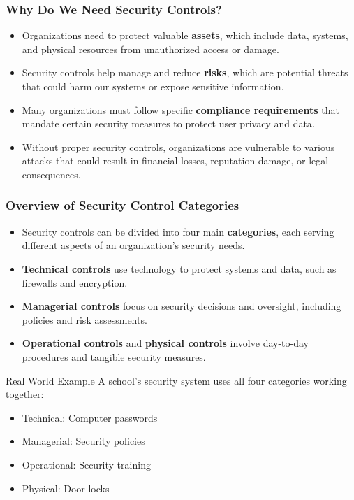 \documentclass{beamer}
\begin{document}
\begin{frame}
    \frametitle{Why Do We Need Security Controls?}
    
    \begin{itemize}
        \item Organizations need to protect valuable \textbf{assets}, which include data, systems, and physical resources from unauthorized access or damage.
        
        \item Security controls help manage and reduce \textbf{risks}, which are potential threats that could harm our systems or expose sensitive information.
        
        \item Many organizations must follow specific \textbf{compliance requirements} that mandate certain security measures to protect user privacy and data.
        
        \item Without proper security controls, organizations are vulnerable to various attacks that could result in financial losses, reputation damage, or legal consequences.
    \end{itemize}
\end{frame}

\begin{frame}
    \frametitle{Overview of Security Control Categories}
    
    \begin{itemize}
        \item Security controls can be divided into four main \textbf{categories}, each serving different aspects of an organization's security needs.
        
        \item \textbf{Technical controls} use technology to protect systems and data, such as firewalls and encryption.
        
        \item \textbf{Managerial controls} focus on security decisions and oversight, including policies and risk assessments.
        
        \item \textbf{Operational controls} and \textbf{physical controls} involve day-to-day procedures and tangible security measures.
    \end{itemize}
    
    \begin{exampleblock}{Real World Example}
        A school's security system uses all four categories working together:
        \begin{itemize}
            \item Technical: Computer passwords
            \item Managerial: Security policies
            \item Operational: Security training
            \item Physical: Door locks
        \end{itemize}
    \end{exampleblock}
\end{frame}
\end{document}
